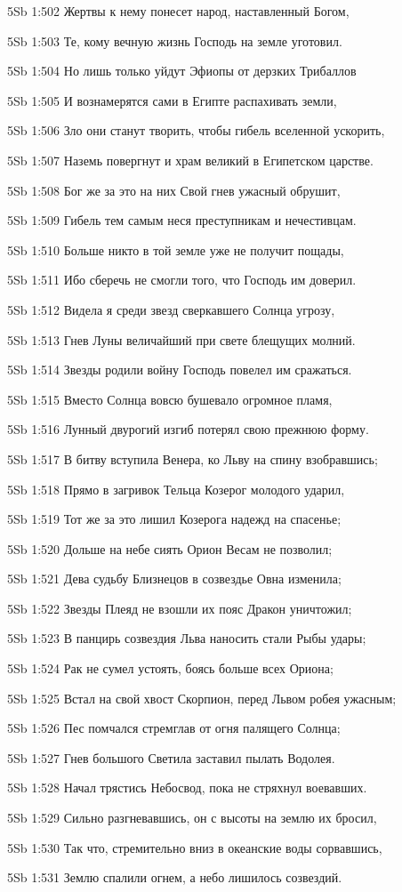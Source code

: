 \vs 5Sb 1:502 Жертвы к нему понесет народ, наставленный Богом,  

\vs 5Sb 1:503 Те, кому вечную жизнь Господь на земле уготовил.

\vs 5Sb 1:504 Но лишь только уйдут Эфиопы от дерзких Трибаллов 

\vs 5Sb 1:505 И вознамерятся сами в Египте распахивать земли, 

\vs 5Sb 1:506 Зло они станут творить, чтобы гибель вселенной ускорить, 

\vs 5Sb 1:507 Наземь повергнут и храм великий в Египетском царстве. 

\vs 5Sb 1:508 Бог же за это на них Свой гнев ужасный обрушит, 

\vs 5Sb 1:509 Гибель тем самым неся преступникам и нечестивцам. 

\vs 5Sb 1:510 Больше никто в той земле уже не получит пощады, 

\vs 5Sb 1:511 Ибо сберечь не смогли того, что Господь им доверил.

\vs 5Sb 1:512 Видела я среди звезд сверкавшего Солнца угрозу,

\vs 5Sb 1:513 Гнев Луны величайший при свете блещущих молний.

\vs 5Sb 1:514 Звезды родили войну  Господь повелел им сражаться. 

\vs 5Sb 1:515 Вместо Солнца вовсю бушевало огромное пламя,

\vs 5Sb 1:516 Лунный двурогий изгиб потерял свою прежнюю форму.

\vs 5Sb 1:517 В битву вступила Венера, ко Льву на спину взобравшись;

\vs 5Sb 1:518 Прямо в загривок Тельца Козерог молодого ударил,

\vs 5Sb 1:519 Тот же за это лишил Козерога надежд на спасенье; 

\vs 5Sb 1:520 Дольше на небе сиять Орион Весам не позволил;

\vs 5Sb 1:521 Дева судьбу Близнецов в созвездье Овна изменила;

\vs 5Sb 1:522 Звезды Плеяд не взошли  их пояс Дракон уничтожил;

\vs 5Sb 1:523 В панцирь созвездия Льва наносить стали Рыбы удары;

\vs 5Sb 1:524 Рак не сумел устоять, боясь больше всех Ориона; 

\vs 5Sb 1:525 Встал на свой хвост Скорпион, перед Львом робея ужасным;

\vs 5Sb 1:526 Пес помчался стремглав от огня палящего Солнца;

\vs 5Sb 1:527 Гнев большого Светила заставил пылать Водолея. 

\vs 5Sb 1:528 Начал трястись Небосвод, пока не стряхнул воевавших. 

\vs 5Sb 1:529 Сильно разгневавшись, он с высоты на землю их бросил, 

\vs 5Sb 1:530 Так что, стремительно вниз в океанские воды сорвавшись, 

\vs 5Sb 1:531 Землю спалили огнем, а небо лишилось созвездий.
